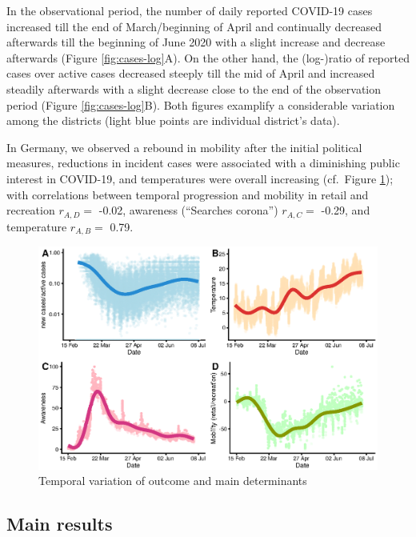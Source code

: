 \documentclass[]{elsarticle} %
\makeatletter
\def\maxwidth{\ifdim\Gin@nat@width>\linewidth\linewidth
\else\Gin@nat@width\fi}
\let\Oldincludegraphics\includegraphics
\renewcommand{\includegraphics}[1]{\Oldincludegraphics[width=\maxwidth]{#1}}
\makeatother
\begin{document}
In the observational period, the number of daily reported COVID-19 cases
increased till the end of March/beginning of April and continually
decreased afterwards till the beginning of June 2020 with a slight
increase and decrease afterwards (Figure \ref{fig:cases-log}A). On the
other hand, the (log-)ratio of reported cases over active cases
decreased steeply till the mid of April and increased steadily
afterwards with a slight decrease close to the end of the observation
period (Figure \ref{fig:cases-log}B). Both figures examplify a
considerable variation among the districts (light blue points are
individual district's data).

In Germany, we observed a rebound in mobility after the initial
political measures, reductions in incident cases were associated with a
diminishing public interest in COVID-19, and temperatures were overall
increasing (cf.~Figure \ref{fig:timeseries}); with correlations between
temporal progression and mobility in retail and recreation \(r_{A,D}=\)
-0.02, awareness (``Searches corona'') \(r_{A,C}=\) -0.29, and
temperature \(r_{A,B}=\) 0.79.

\begin{figure}
\centering
\includegraphics{figures/f_timeseries_exposures.eps}
\caption{\label{fig:timeseries}Temporal variation of outcome and main
determinants}
\end{figure}

\subsection{Main results}\label{main-results}
\end{document}
